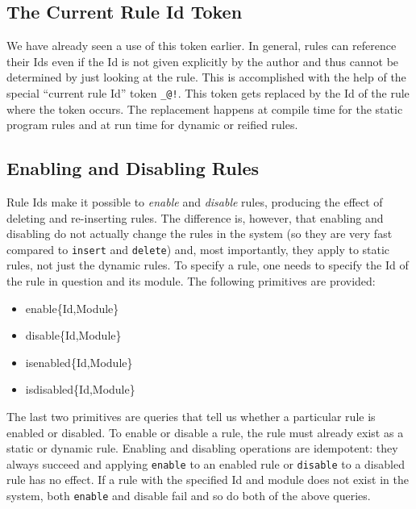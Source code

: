 \documentclass[11pt]{article}
\begin{document}
\subsection{The Current Rule Id Token} 
We have already seen a use of this token earlier. In general,
rules can reference their Ids even if the Id is not given explicitly by the
author and thus cannot be determined by just looking at the rule. This is
accomplished with the help of the special ``current rule Id'' token
\texttt{\_@!}. This token gets replaced by the Id of the rule where
the token occurs. The replacement happens at compile time for the static
program rules and at run time for dynamic or reified rules.

\subsection{Enabling and Disabling Rules}
Rule Ids make it possible to \emph{enable} and \emph{disable} rules,
producing the effect of deleting and re-inserting rules.
The difference is, however, that enabling and disabling do not actually
change the rules in the system (so they are very fast compared to
\texttt{insert} and \texttt{delete}) and, most importantly, they apply to
static rules, not just the dynamic rules.  To specify a rule, one needs to
specify the Id of the rule in question and its module. The following
primitives are provided:
\begin{itemize}
\item enable\{Id,Module\}
\item disable\{Id,Module\}
\item isenabled\{Id,Module\}
\item isdisabled\{Id,Module\}
\end{itemize}
The last two primitives are queries that tell us whether a particular rule
is enabled or disabled. To enable or disable a rule, the rule must already
exist as a static or dynamic rule. Enabling  and disabling operations are
idempotent: they always succeed and applying \texttt{enable} to an enabled
rule or \texttt{disable} to a disabled rule has no effect.  
If a rule with the specified Id and module does not exist in the system,
both \texttt{enable} and disable fail and so do both of the above queries.
\end{document}
